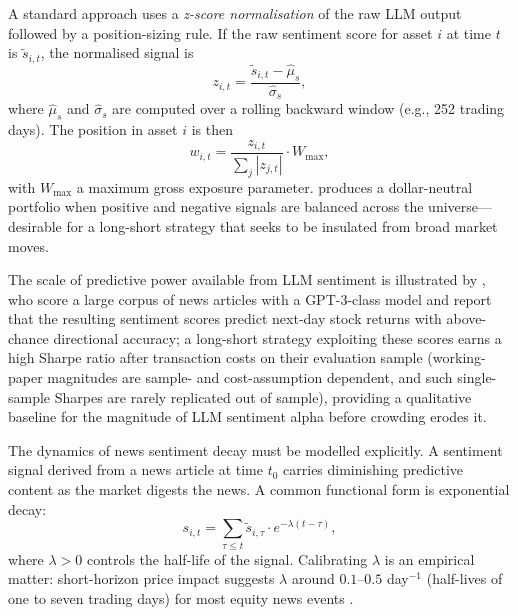 A standard approach uses a \emph{z-score normalisation} of the raw LLM output followed
by a position-sizing rule. If the raw sentiment score for asset $i$ at time $t$ is
$\tilde{s}_{i,t}$, the normalised signal is
\begin{equation}
  z_{i,t} = \frac{\tilde{s}_{i,t} - \hat{\mu}_s}{\hat{\sigma}_s},
  \label{eq:ch10-zscore}
\end{equation}
where $\hat{\mu}_s$ and $\hat{\sigma}_s$ are computed over a rolling backward window
(e.g., 252 trading days). The position in asset $i$ is then
\begin{equation}
  w_{i,t} = \frac{z_{i,t}}{\sum_j |z_{j,t}|} \cdot W_{\max},
  \label{eq:ch10-position-sizing}
\end{equation}
with $W_{\max}$ a maximum gross exposure parameter. 
produces a dollar-neutral portfolio when positive and negative signals are balanced across
the universe---desirable for a long-short strategy that seeks to be insulated from
broad market moves.

The scale of predictive power available from LLM sentiment is illustrated by
\citet{KirtacGermano2024}, who score a large corpus of news articles with a GPT-3-class model
and report that the resulting sentiment scores predict next-day stock returns with
above-chance directional accuracy; a long-short strategy exploiting these scores earns a
high Sharpe ratio after transaction costs on their evaluation sample (working-paper
magnitudes are sample- and cost-assumption dependent, and such single-sample Sharpes are
rarely replicated out of sample), providing a qualitative baseline for the magnitude of
LLM sentiment alpha before crowding erodes it.

The dynamics of news sentiment decay must be modelled explicitly. A sentiment signal
derived from a news article at time $t_0$ carries diminishing predictive content as the
market digests the news. A common functional form is exponential decay:
\begin{equation}
  s_{i,t} = \sum_{\tau \leq t} \tilde{s}_{i,\tau} \cdot e^{-\lambda(t - \tau)},
  \label{eq:ch10-ewma-sentiment}
\end{equation}
where $\lambda > 0$ controls the half-life of the signal. Calibrating $\lambda$ is an
empirical matter: short-horizon price impact suggests $\lambda$ around $0.1$--$0.5$
day$^{-1}$ (half-lives of one to seven trading days) for most equity news events
\citep{grinold2000active}.

